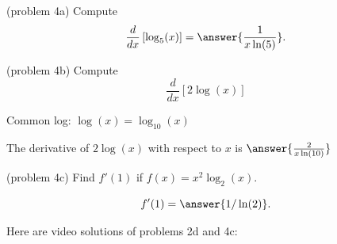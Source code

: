 \documentclass[handout]{ximera}
\begin{document}
\begin{problem}(problem 4a)
Compute
\[
\ddx \left[\log_5(x)\right] = \answer{\frac{1}{x\ln(5)}}.
\]
\end{problem}


\begin{problem}(problem 4b)
  Compute 
  \[
  \frac{d}{dx} \left[2\log(x)\right]
  \]
  
		\begin{hint}
		  Common log: $\log(x) = \log_{10}(x)$ 
		\end{hint}
	
		
		The derivative of $2\log(x)$ with respect to $x$ is
		 $\answer{\frac{2}{x\ln(10)}}$
	
\end{problem}


\begin{problem}(problem 4c)
Find $f'(1)$ if $f(x) = x^2 \log_2(x)$.

\[
f'(1) = \answer{1/\ln(2)}.
\]

\end{problem}

Here are video solutions of problems 2d and 4c:
\begin{foldable}
\end{foldable}
\end{document}
